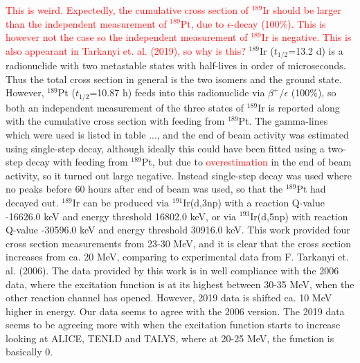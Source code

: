 \documentclass[a4paper,11pt,twoside]{book}
\begin{document}
\subsubsection{}
\textcolor{red}{This is weird. Expectedly, the cumulative cross section of $^{189}$Ir should be larger than the independent measurement of $^{189}$Pt, due to $\epsilon$-decay (100\%). This is however not the case so the independent measurement of $^{189}$Ir is negative. This is also appearant in Tarkanyi et. al. (2019), so why is this?}
$^{189}$Ir ($t_{1/2}$=13.2 d) is a radionuclide with two metastable states with half-lives in order of microseconds. Thus the total cross section in general is the two isomers and the ground state. However, $^{189}$Pt ($t_{1/2}$=10.87 h) feeds into this radionuclide via $\beta^+/\epsilon$ (100\%), so both an independent measurement of the three states of $^{189}$Ir is reported along with the cumulative cross section with feeding from $^{189}$Pt. The gamma-lines which were used is listed in table ..., and the end of beam activity was estimated using single-step decay, although ideally this could have been fitted using a two-step decay with feeding from $^{189}$Pt, but due to \textcolor{red}{overestimation} in the end of beam activity, so it turned out large negative. Instead single-step decay was used where no peaks before 60 hours after end of beam was used, so that the $^{189}$Pt had decayed out.  
$^{189}$Ir can be produced via $^{191}$Ir(d,3np) with a reaction Q-value -16626.0 keV and energy threshold 16802.0 keV, or via $^{193}$Ir(d,5np) with reaction Q-value -30596.0 keV and energy threshold 30916.0 keV. This work provided four cross section measurements from 23-30 MeV, and it is clear that the cross section increases from ca. 20 MeV, comparing to experimental data from F. Tarkanyi et. al. (2006). The data provided by this work is in well compliance with the 2006 data, where the excitation function is at its highest between 30-35 MeV, when the other reaction channel has opened. However, 2019 data is shifted ca. 10 MeV higher in energy. Our data seems to agree with the 2006 version.  The 2019 data seems to be agreeing more with when the excitation function starts to increase looking at ALICE, TENLD and TALYS, where at 20-25 MeV, the function is basically 0. 
\end{document}
